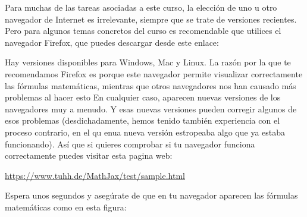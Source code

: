 \documentclass[10pt,a4paper]{article}
\newcounter {cont01}
\begin{document}
Para muchas de las tareas asociadas a este curso, la elección de uno u otro navegador de Internet
es irrelevante, siempre que se trate de versiones recientes. Pero para algunos temas concretos del curso es 
recomendable que utilices el navegador Firefox, que puedes descargar desde  este enlace:
\begin{center}
\end{center}
Hay versiones disponibles para Windows, Mac y Linux. La razón por la que te recomendamos Firefox es
porque este navegador permite visualizar correctamente las fórmulas matemáticas, mientras que otros 
navegadores nos han causado más problemas al hacer esto
En cualquier caso, aparecen nuevas versiones de los navegadores muy a menudo. Y esas nuevas versiones pueden corregir algunos de esos problemas (desdichadamente, hemos tenido también experiencia con el proceso contrario, en el qu enua nueva versión estropeaba algo que ya estaba funcionando). Así que si quieres comprobar si tu navegador funciona correctamente puedes visitar esta pagina web: 
\begin{center}
\href{https://www.tuhh.de/MathJax/test/sample.html}{https://www.tuhh.de/MathJax/test/sample.html}
\end{center}
Espera unos segundos y asegúrate de que en tu navegador aparecen las fórmulas matemáticas como en esta figura:
\end{document}
